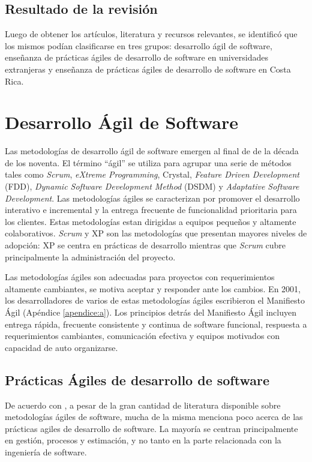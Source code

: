 \subsection{Resultado de la revisión} \label{sec:resultado-rev-lit}
Luego de obtener los artículos, literatura y recursos relevantes, se identificó que los mismos podían clasificarse en tres grupos: desarrollo ágil de software, enseñanza de prácticas ágiles de desarrollo de software en universidades extranjeras y enseñanza de prácticas ágiles de desarrollo de software en Costa Rica.



\section{Desarrollo Ágil de Software} \label{sec:desarrollo-agil}
Las metodologías de desarrollo ágil de software emergen al final de de la década de los noventa. El término ``ágil'' se utiliza para agrupar una serie de métodos tales como \emph{Scrum}, \emph{eXtreme Programming}, Crystal, \emph{Feature Driven Development} (FDD), \emph{Dynamic Software Development Method} (DSDM) y \emph{Adaptative Software Development}\cite{rashina-et-al}. Las metodologías ágiles se caracterizan por promover el desarrollo interativo e incremental y la entrega frecuente de funcionalidad prioritaria para los clientes. Estas metodologías estan dirigidas a equipos pequeños y altamente colaborativos. \emph{Scrum} y XP son las metodologías que presentan mayores niveles de adopción\cite{version-one}: XP se centra en prácticas de desarrollo mientras que \emph{Scrum} cubre principalmente la administración del proyecto.

Las metodologías ágiles son adecuadas para proyectos con requerimientos altamente cambiantes, se motiva aceptar y responder ante los cambios. En 2001, los desarrolladores de varios de estas metodologías ágiles escribieron el Manifiesto Ágil \cite{agile-manifesto} (Apéndice \ref{apendice:a}). Los principios detrás del Manifiesto Ágil incluyen entrega rápida, frecuente consistente y continua de software funcional, respuesta a requerimientos cambiantes, comunicación efectiva y equipos motivados con capacidad de auto organizarse.

\subsection{Prácticas Ágiles de desarrollo de software} \label{sec:practicas-agiles-desarrollo}
De acuerdo con \cite{ford}, a pesar de la gran cantidad de literatura disponible sobre metodologías ágiles de software, mucha de la misma menciona poco acerca de las prácticas agiles de desarrollo de software. La mayoría se centran principalmente en gestión, procesos y estimación, y no tanto en la parte relacionada con la ingeniería de software.

